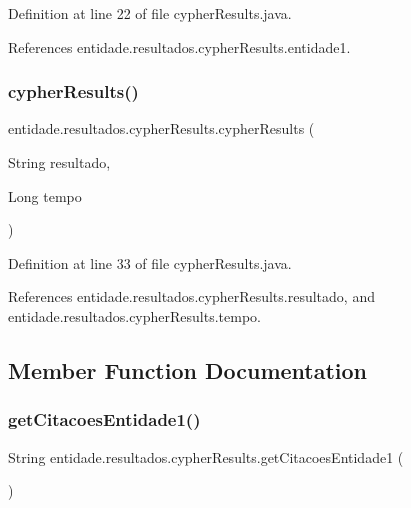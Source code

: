 Definition at line 22 of file cypher\+Results.\+java.



References entidade.\+resultados.\+cypher\+Results.\+entidade1.

\hypertarget{classentidade_1_1resultados_1_1cypherResults_a5582207c17ecffee1196df3f582a3694}{}\label{classentidade_1_1resultados_1_1cypherResults_a5582207c17ecffee1196df3f582a3694} 
\subsubsection{\texorpdfstring{cypher\+Results()}{cypherResults()}\hspace{0.1cm}{\footnotesize\ttfamily [2/2]}}
{\footnotesize\ttfamily entidade.\+resultados.\+cypher\+Results.\+cypher\+Results (\begin{DoxyParamCaption}\item[{String}]{resultado,  }\item[{Long}]{tempo }\end{DoxyParamCaption})}



Definition at line 33 of file cypher\+Results.\+java.



References entidade.\+resultados.\+cypher\+Results.\+resultado, and entidade.\+resultados.\+cypher\+Results.\+tempo.



\subsection{Member Function Documentation}
\hypertarget{classentidade_1_1resultados_1_1cypherResults_a3f9d461ed5dc60198a4cb09a7c39a992}{}\label{classentidade_1_1resultados_1_1cypherResults_a3f9d461ed5dc60198a4cb09a7c39a992} 
\subsubsection{\texorpdfstring{get\+Citacoes\+Entidade1()}{getCitacoesEntidade1()}}
{\footnotesize\ttfamily String entidade.\+resultados.\+cypher\+Results.\+get\+Citacoes\+Entidade1 (\begin{DoxyParamCaption}{ }\end{DoxyParamCaption})}



